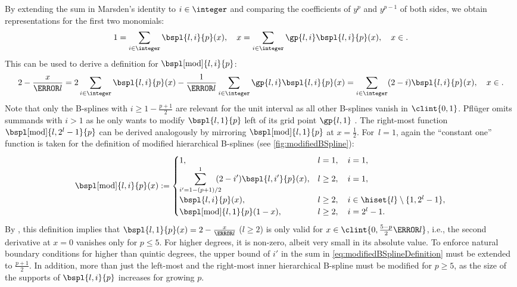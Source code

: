 By extending the sum in Marsden's identity to $i \in \integer$ and
comparing the coefficients of $y^p$ and $y^{p-1}$ of both sides,
we obtain representations for the first two monomials:
\begin{equation}
  1
  = \sum_{i \in \integer} \bspl{l,i}{p}(x),\quad
  x
  = \sum_{i \in \integer} \gp{l,i} \bspl{l,i}{p}(x),\quad
  x \in \real.
\end{equation}
This can be used to derive a definition for $\bspl[\modified]{l,i}{p}$:
\begin{equation}
  \label{eq:modifiedBSplineConstruction}
  2 - \frac{x}{\ms{l}}
  = 2 \sum_{i \in \integer} \bspl{l,i}{p}(x)
  - \frac{1}{\ms{l}} \sum_{i \in \integer} \gp{l,i} \bspl{l,i}{p}(x)
  = \sum_{i \in \integer} (2 - i) \bspl{l,i}{p}(x),\quad
  x \in \real.
\end{equation}
Note that only the B-splines with $i \ge 1 - \tfrac{p+1}{2}$
are relevant for the unit interval
as all other B-splines vanish in $\clint{0, 1}$.
Pflüger omits summands with $i > 1$ as he only wants to modify
$\bspl{l,1}{p}$ left of its grid point $\gp{l,1}$ \cite{Pflueger10Spatially}.
The right-most function $\bspl[\modified]{l,2^l-1}{p}$ can be derived
analogously by mirroring $\bspl[\modified]{l,1}{p}$ at $x = \tfrac{1}{2}$.
\pagebreak%
For~$l = 1$, again the ``constant one'' function is taken for the definition
of modified hierarchical B-splines (see \cref{fig:modifiedBSpline}):
{%
  \setlength{\abovedisplayskip}{9pt}%
  \setlength{\belowdisplayskip}{9pt}%
  \begin{equation}
    \label{eq:modifiedBSplineDefinition}
    \bspl[\modified]{l,i}{p}(x)
    :=
    \begin{cases}
      1,&
      l = 1,\quad i = 1,\\
      \displaystyle\sum_{i'=1-(p+1)/2}^1\!\!\!\! (2 - i') \bspl{l,i'}{p}(x),&
      l \ge 2,\quad i = 1,\\
      \bspl{l,i}{p}(x),&
      l \ge 2,\quad i \in \hiset{l} \setminus \{1, 2^l - 1\},\\
      \bspl[\modified]{l,1}{p}(1 - x),&
      l \ge 2,\quad i = 2^l - 1.
    \end{cases}
  \end{equation}%
}%
By ,
this definition implies that
$\bspl{l,1}{p}(x) = 2 - \tfrac{x}{\ms{l}}$ ($l \ge 2$)
is only valid for $x \in \clint{0, \tfrac{5-p}{2} \ms{l}}$, i.e.,
the second derivative at $x = 0$ vanishes only for $p \le 5$.
For higher degrees, it is non-zero, albeit very small
in its absolute value.
To enforce natural boundary conditions
for higher than quintic degrees,
the upper bound of $i'$ in the sum in \eqref{eq:modifiedBSplineDefinition}
must be extended to $\tfrac{p+1}{2}$.
In addition, more than just the left-most and the right-most inner
hierarchical B-spline must be modified for $p \ge 5$,
as the size of the supports of $\bspl{l,i}{p}$ increases
for growing $p$.

